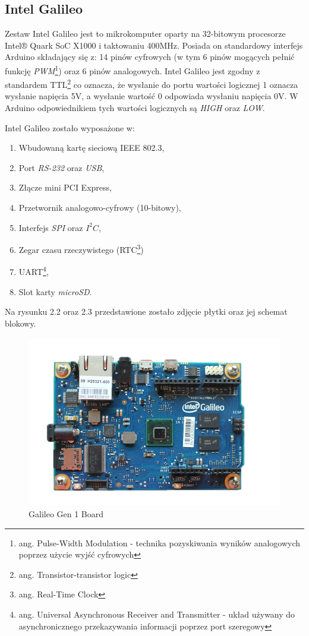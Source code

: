 \documentclass{xmgr}
\begin{document}
\subsection{Intel Galileo}
Zestaw Intel Galileo jest  to mikrokomputer oparty na 32-bitowym procesorze Intel® Quark SoC X1000 i taktowaniu 400MHz. Posiada on standardowy interfejs Arduino składający się z: 14 pinów cyfrowych (w tym 6 pinów mogących pełnić funkcję \emph{PWM}\footnote{ang. Pulse-Width Modulation - technika pozyskiwania wyników analogowych poprzez użycie wyjść cyfrowych}) oraz 6 pinów analogowych. Intel Galileo jest zgodny z standardem TTL\footnote{ang. Transistor-transistor logic} co oznacza, że wysłanie do portu wartości logicznej 1 oznacza wysłanie napięcia 5V, a wysłanie wartość 0 odpowiada wysłaniu napięcia 0V. W Arduino odpowiednikiem tych wartości logicznych są \emph{HIGH} oraz \emph{LOW}.

Intel Galileo zostało wyposażone w:
\begin{enumerate}
  \item Wbudowaną kartę sieciową IEEE 802.3, 
  \item Port \emph{RS-232} oraz \emph{USB},
  \item Złącze mini PCI Express,
  \item Przetwornik analogowo-cyfrowy (10-bitowy),
  \item Interfejs \emph{SPI} oraz $I^2C$,
  \item Zegar czasu rzeczywistego (RTC\footnote{ang. Real-Time Clock})
  \item UART\footnote{ang. Universal Asynchronous Receiver and Transmitter - układ używany do asynchronicznego przekazywania informacji poprzez port szeregowy},
  \item Slot karty \emph{microSD}.\cite{GalileoBook}
\end{enumerate}

Na rysunku 2.2 oraz 2.3 przedstawione zostało zdjęcie płytki oraz jej schemat blokowy.

\begin{figure}[!h]
    \centering
    \includegraphics[height=0.4\textwidth]{images/galileo.png}
    \caption{Galileo Gen 1 Board \label{Galileo Gen 1 Board}}
\end{figure}
\end{document}

